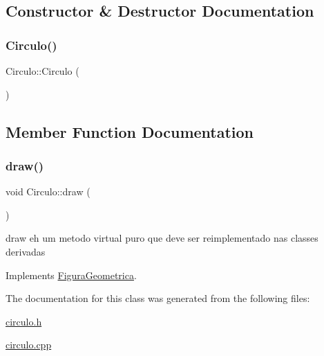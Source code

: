 \subsection{Constructor \& Destructor Documentation}
\mbox{\label{class_circulo_a6933bf908b78a4167684081a3a8f257f}} 
\subsubsection{\texorpdfstring{Circulo()}{Circulo()}}
{\footnotesize\ttfamily Circulo\+::\+Circulo (\begin{DoxyParamCaption}{ }\end{DoxyParamCaption})}



\subsection{Member Function Documentation}
\mbox{\label{class_circulo_aa94899872fb6c586d1343df1d9ce0d86}} 
\subsubsection{\texorpdfstring{draw()}{draw()}}
{\footnotesize\ttfamily void Circulo\+::draw (\begin{DoxyParamCaption}{ }\end{DoxyParamCaption})\hspace{0.3cm}{\ttfamily [virtual]}}



draw eh um metodo virtual puro que deve ser reimplementado nas classes derivadas 



Implements \hyperlink{class_figura_geometrica_a727cea2befcb22b2457c088127fe041d}{Figura\+Geometrica}.



The documentation for this class was generated from the following files\+:\begin{DoxyCompactItemize}
\item 
\hyperlink{circulo_8h}{circulo.\+h}\item 
\hyperlink{circulo_8cpp}{circulo.\+cpp}\end{DoxyCompactItemize}
